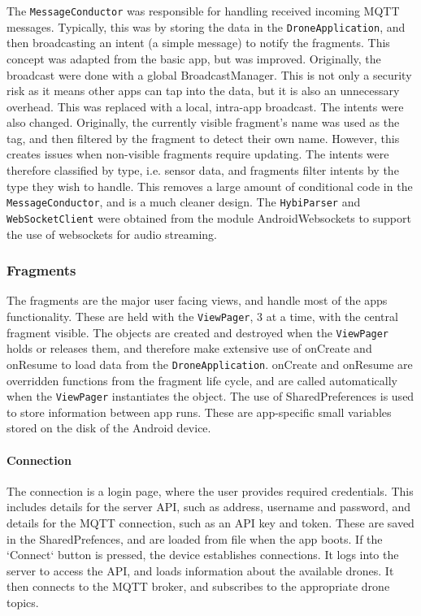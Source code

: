 \documentclass{article}
\begin{document}
The \texttt{MessageConductor} was responsible for handling received incoming MQTT messages. Typically, this was by storing the data in the \texttt{DroneApplication}, and then broadcasting an intent (a simple message) to notify the fragments. This concept was adapted from the basic app, but was improved. Originally, the broadcast were done with a global BroadcastManager. This is not only a security risk as it means other apps can tap into the data, but it is also an unnecessary overhead. This was replaced with a local, intra-app broadcast. The intents were also changed. Originally, the currently visible fragment's name was used as the tag, and then filtered by the fragment to detect their own name. However, this creates issues when non-visible fragments require updating. The intents were therefore classified by type, i.e. sensor data, and fragments filter intents by the type they wish to handle. This removes a large amount of conditional code in the \texttt{MessageConductor}, and is a much cleaner design. The \texttt{HybiParser} and \texttt{WebSocketClient} were obtained from the module AndroidWebsockets\cite{androidWebsockets} to support the use of websockets for audio streaming.

\subsubsection{Fragments}
The fragments are the major user facing views, and handle most of the apps functionality. These are held with the \texttt{ViewPager}, 3 at a time, with the central fragment visible. The objects are created and destroyed when the \texttt{ViewPager} holds or releases them, and therefore make extensive use of onCreate and onResume to load data from the \texttt{DroneApplication}. onCreate and onResume are overridden functions from the fragment life cycle, and are called automatically when the \texttt{ViewPager} instantiates the object. The use of SharedPreferences is used to store information between app runs. These are app-specific small variables stored on the disk of the Android device.

\paragraph{Connection}
The connection is a login page, where the user provides required credentials. This includes details for the server API, such as address, username and password, and details for the MQTT connection, such as an API key and token. These are saved in the SharedPrefences, and are loaded from file when the app boots. If the `Connect` button is pressed, the device establishes connections. It logs into the server to access the API, and loads information about the available drones. It then connects to the MQTT broker, and subscribes to the appropriate drone topics.
\end{document}
